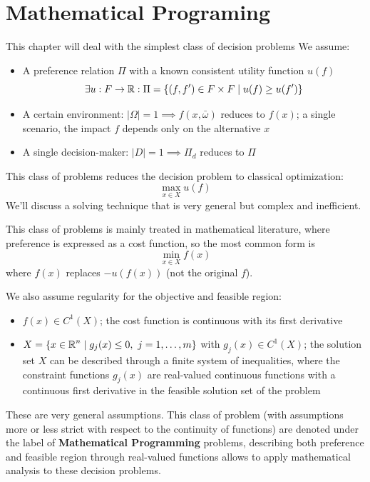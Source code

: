 \chapter{Mathematical Programing}
\label{ch:mathprog}

This chapter will deal with the simplest class of decision problems We assume:
\begin{itemize}
	\item A preference relation $\Pi$ with a known consistent utility function $u(f)$
	$$ \exists u: F \rightarrow \operatorname{\mathbb{R}} : \Pi = \left\{(f,f') \in F \times F \mid u(f) \geq u(f')\right\} $$
	
	\item A certain environment: $|\Omega| = 1 \implies f(x, \bar \omega)$ reduces to $f(x)$; a single scenario, the impact $f$ depends only on the alternative $x$
	
	\item A single decision-maker: $|D| = 1 \implies \Pi_d$ reduces to $\Pi$
\end{itemize}

This class of problems reduces the decision problem to classical optimization: 
$$ \max_{x \in X} u(f) $$
We'll discuss a solving technique that is very general but complex and inefficient.

This class of problems is mainly treated in mathematical literature, where preference is expressed as a cost function, so the most common form is
$$ \min_{x \in X} f(x) $$
where $f(x)$  replaces $-u(f(x))$ (not the original $f$).

We also assume regularity for the objective and feasible region:
\begin{itemize}
	\item $f(x) \in C^1 (X)$; the cost function is continuous with its first derivative
	
	\item $X = \left\{x \in \operatorname{\mathbb{R}}^n \mid g_j (x) \leq 0, \ j = 1, \dots, m\right\}$ with $g_j (x) \in C^1 (X)$; the solution set $X$ can be described through a finite system of inequalities, where the constraint functions $g_j(x)$ are real-valued continuous functions with a continuous first derivative in the feasible solution set of the problem
\end{itemize}

These are very general assumptions. This class of problem (with assumptions more or less strict with respect to the continuity of functions) are denoted under the label of \textbf{Mathematical Programming} problems, describing both preference and feasible region through real-valued functions allows to apply mathematical analysis to these decision problems.

